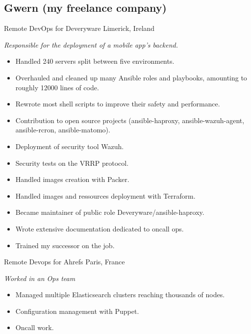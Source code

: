 \documentclass[]{friggeri-cv} %
\begin{document}
\subsection{Gwern (my freelance company)}
\begin{entrylist}
 {Remote DevOps for Deveryware} {Limerick, Ireland} {
  \emph{Responsible for the deployment of a mobile app's backend.}
  \begin{itemize}
    \item Handled 240 servers split between five environments.
    \item Overhauled and cleaned up many Ansible roles and playbooks, amounting to roughly 12000 lines of code.
    \item Rewrote most shell scripts to improve their safety and performance.
    \item Contribution to open source projects (ansible-haproxy, ansible-wazuh-agent, ansible-rcron, ansible-matomo).
    \item Deployment of security tool Wazuh.
    \item Security tests on the VRRP protocol.
    \item Handled images creation with Packer.
    \item Handled images and ressources deployment with Terraform.
    \item Became maintainer of public role Deveryware/ansible-haproxy.
    \item Wrote extensive documentation dedicated to oncall ops.
    \item Trained my successor on the job.
  \end{itemize}
}
 {Remote Devops for Ahrefs} {Paris, France} {
  \emph{Worked in an Ops team}
  \begin{itemize}
    \item Managed multiple Elasticsearch clusters reaching thousands of nodes.
    \item Configuration management with Puppet.
    \item Oncall work.
  \end{itemize}
}
\end{entrylist}
\end{document}
